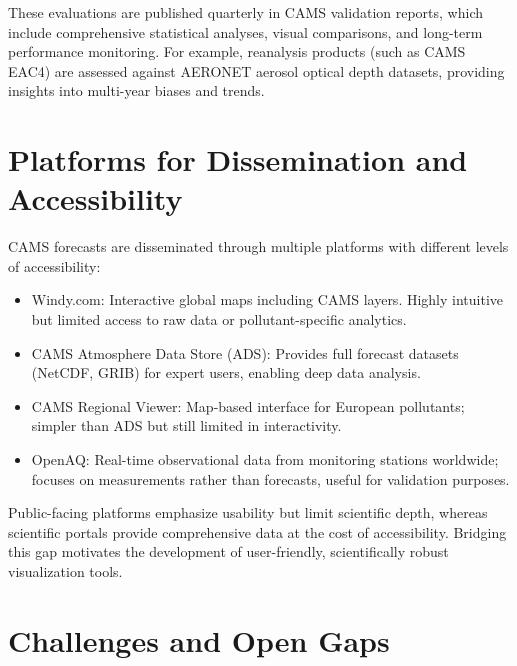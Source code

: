 These evaluations are published quarterly in CAMS validation reports, which include comprehensive statistical analyses, visual comparisons, and long-term performance monitoring. For example, reanalysis products (such as CAMS EAC4) are assessed against AERONET aerosol optical depth datasets, providing insights into multi-year biases and trends.





\section{Platforms for Dissemination and Accessibility}
CAMS forecasts are disseminated through multiple platforms with different levels of accessibility:
\begin{itemize}
	\item Windy.com: Interactive global maps including CAMS layers. Highly intuitive but limited access to raw data or pollutant-specific analytics.
	\item CAMS Atmosphere Data Store (ADS): Provides full forecast datasets (NetCDF, GRIB) for expert users, enabling deep data analysis.
	\item CAMS Regional Viewer: Map-based interface for European pollutants; simpler than ADS but still limited in interactivity.
	\item OpenAQ: Real-time observational data from monitoring stations worldwide; focuses on measurements rather than forecasts, useful for validation purposes.
\end{itemize}
Public-facing platforms emphasize usability but limit scientific depth, whereas scientific portals provide comprehensive data at the cost of accessibility. Bridging this gap motivates the development of user-friendly, scientifically robust visualization tools.

\section{Challenges and Open Gaps}

